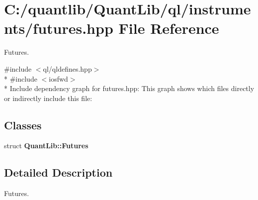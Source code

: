 \section{C\+:/quantlib/\+Quant\+Lib/ql/instruments/futures.hpp File Reference}
\label{futures_8hpp}


Futures.  


{\ttfamily \#include $<$ql/qldefines.\+hpp$>$}\\*
{\ttfamily \#include $<$iosfwd$>$}\\*
Include dependency graph for futures.\+hpp\+:
This graph shows which files directly or indirectly include this file\+:
\subsection*{Classes}
\begin{DoxyCompactItemize}
\item 
struct {\bf Quant\+Lib\+::\+Futures}
\end{DoxyCompactItemize}


\subsection{Detailed Description}
Futures. 

